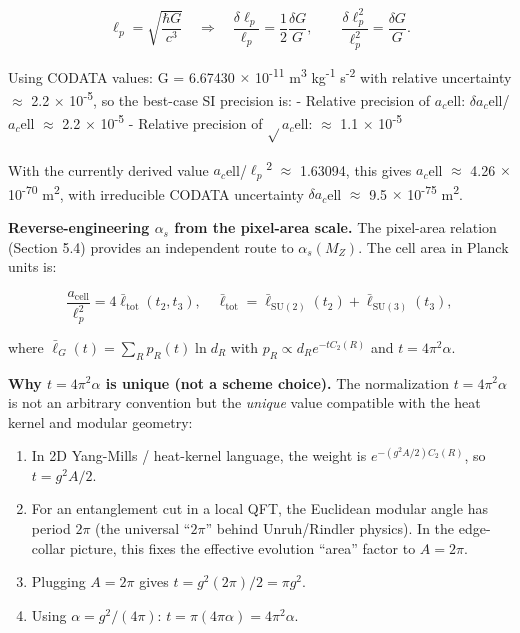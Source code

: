 \documentclass[11pt,a4paper]{article}
\theoremstyle{remark}
\begin{document}
\[
\ell_p = \sqrt{\frac{\hbar G}{c^3}} \quad \Rightarrow \quad
\frac{\delta \ell_p}{\ell_p} = \frac{1}{2}\frac{\delta G}{G}, \qquad
\frac{\delta \ell_p^2}{\ell_p^2} = \frac{\delta G}{G}.
\]

Using CODATA values: G = 6.67430 \ensuremath{\times} 10\textsuperscript{-11} m\textsuperscript{3} kg\textsuperscript{-1} s\textsuperscript{-2} with relative uncertainty \ensuremath{\approx} 2.2 \ensuremath{\times} 10\textsuperscript{-5}, so the best-case SI precision is:
- Relative precision of \(a_c\)ell: \(\ensuremath{\delta}a_c\)ell/\(a_c\)ell \ensuremath{\approx} 2.2 \ensuremath{\times} 10\textsuperscript{-5}
- Relative precision of \ensuremath{\sqrt{}}\(a_c\)ell: \ensuremath{\approx} 1.1 \ensuremath{\times} 10\textsuperscript{-5}

With the currently derived value \(a_c\)ell/\(\ensuremath{\ell}_p\)\textsuperscript{2} \ensuremath{\approx} 1.63094, this gives \(a_c\)ell \ensuremath{\approx} 4.26 \ensuremath{\times} 10\textsuperscript{-70} m\textsuperscript{2}, with irreducible CODATA uncertainty \(\ensuremath{\delta}a_c\)ell \ensuremath{\approx} 9.5 \ensuremath{\times} 10\textsuperscript{-75} m\textsuperscript{2}.

\textbf{Reverse-engineering \(\ensuremath{\alpha}_s\) from the pixel-area scale.} The pixel-area relation
(Section 5.4) provides an independent route to \(\ensuremath{\alpha}_s(M_Z)\). The cell area in
Planck units is:

\[
\frac{a_{\mathrm{cell}}}{\ell_p^2} = 4 \bar{\ell}_{\mathrm{tot}}(t_2, t_3),
\quad
\bar{\ell}_{\mathrm{tot}} = \bar{\ell}_{\mathrm{SU}(2)}(t_2) + \bar{\ell}_{\mathrm{SU}(3)}(t_3),
\]

where \(\bar{\ell}_G(t) = \sum_R p_R(t) \ln d_R\) with \(p_R \propto d_R e^{-t C_2(R)}\)
and \(t = 4\pi^2 \alpha\).

\textbf{Why \(t = 4\pi^2 \alpha\) is unique (not a scheme choice).} The normalization
\(t = 4\pi^2 \alpha\) is not an arbitrary convention but the \emph{unique} value
compatible with the heat kernel and modular geometry:

\begin{enumerate}
\def\labelenumi{\arabic{enumi}.}
\item
  In 2D Yang-Mills / heat-kernel language, the weight is
  \(e^{-(g^2 A/2) C_2(R)}\), so \(t = g^2 A / 2\).
\item
  For an entanglement cut in a local QFT, the Euclidean modular angle has
  period \(2\pi\) (the universal ``\(2\pi\)'' behind Unruh/Rindler physics). In
  the edge-collar picture, this fixes the effective evolution ``area'' factor
  to \(A = 2\pi\).
\item
  Plugging \(A = 2\pi\) gives \(t = g^2 (2\pi)/2 = \pi g^2\).
\item
  Using \(\alpha = g^2/(4\pi)\): \(t = \pi (4\pi \alpha) = 4\pi^2 \alpha\).
\end{enumerate}
\end{document}
